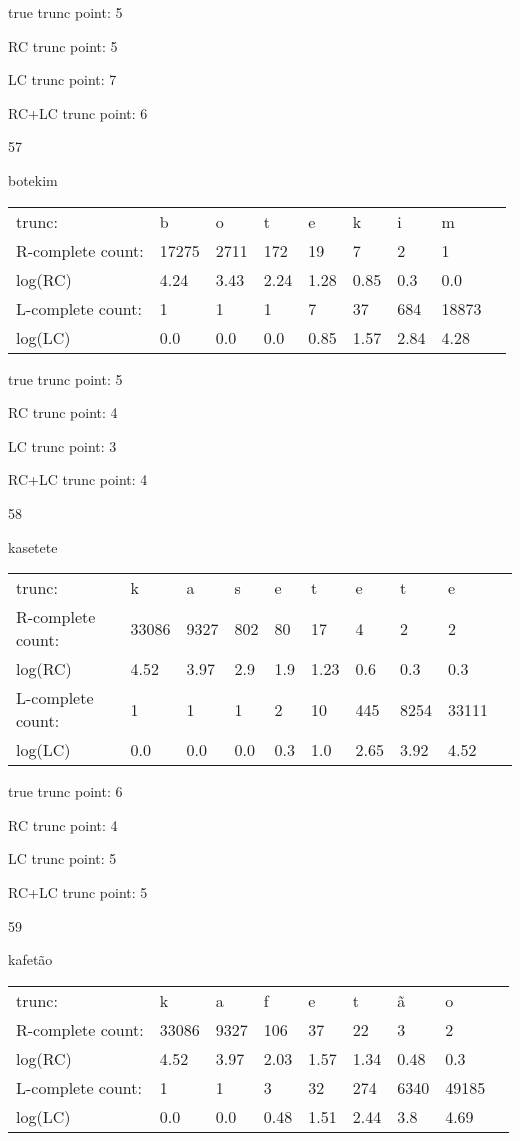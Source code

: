 \documentclass{article}
\begin{document}
true trunc point: 5

RC trunc point: 5

LC trunc point: 7

RC+LC trunc point: 6

\newpage

57

botekim

\begin{tabular}{l|llllllll}
trunc: & b & o & t & e & k & i & m & \\ 
R-complete count: & 17275 & 2711 & 172 & 19 & 7 & 2 & 1 & \\ 
log(RC) & 4.24 & 3.43 & 2.24 & 1.28 & 0.85 & 0.3 & 0.0 & \\ 
L-complete count: & 1 & 1 & 1 & 7 & 37 & 684 & 18873 & \\ 
log(LC) & 0.0 & 0.0 & 0.0 & 0.85 & 1.57 & 2.84 & 4.28 & \\ 
\end{tabular}

true trunc point: 5

RC trunc point: 4

LC trunc point: 3

RC+LC trunc point: 4

\vspace{1em}

58

kasetete

\begin{tabular}{l|lllllllll}
trunc: & k & a & s & e & t & e & t & e & \\ 
R-complete count: & 33086 & 9327 & 802 & 80 & 17 & 4 & 2 & 2 & \\ 
log(RC) & 4.52 & 3.97 & 2.9 & 1.9 & 1.23 & 0.6 & 0.3 & 0.3 & \\ 
L-complete count: & 1 & 1 & 1 & 2 & 10 & 445 & 8254 & 33111 & \\ 
log(LC) & 0.0 & 0.0 & 0.0 & 0.3 & 1.0 & 2.65 & 3.92 & 4.52 & \\ 
\end{tabular}

true trunc point: 6

RC trunc point: 4

LC trunc point: 5

RC+LC trunc point: 5

\vspace{1em}

59

kafetão

\begin{tabular}{l|llllllll}
trunc: & k & a & f & e & t & ã & o & \\ 
R-complete count: & 33086 & 9327 & 106 & 37 & 22 & 3 & 2 & \\ 
log(RC) & 4.52 & 3.97 & 2.03 & 1.57 & 1.34 & 0.48 & 0.3 & \\ 
L-complete count: & 1 & 1 & 3 & 32 & 274 & 6340 & 49185 & \\ 
log(LC) & 0.0 & 0.0 & 0.48 & 1.51 & 2.44 & 3.8 & 4.69 & \\ 
\end{tabular}
\end{document}
